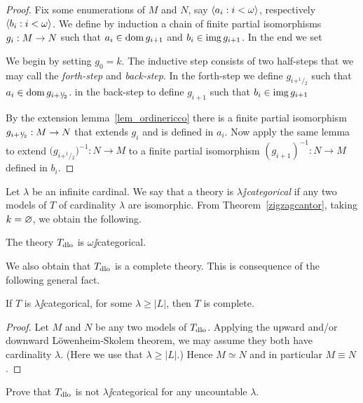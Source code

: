 \documentclass[creche.tex]{subfiles}
\begin{document}
\begin{proof}
Fix some enumerations of $M$ and $N$, say $\langle a_i:i<\omega\rangle$, respectively $\langle b_i:i<\omega\rangle$.  We define by induction a chain of finite partial isomorphisms $g_i:M\rightarrow N$ such that $a_i\in\mathop{\rm dom} g_{i+1}$ and $b_i\in\mathop{\rm img} g_{i+1}$. In the end we set


We begin by setting $g_0=k$. The inductive step consists of two half-steps that we may call the \textit{forth-step} and \textit{back-step}. In the forth-step we define $g_{i+^1\!\!/\!_2}$ such that $a_i\in\mathop{\rm dom} g_{i+^1\!\!/\!_2}$. in the back-step to define $g_{i+1}$ such that $b_i\in\mathop{\rm img} g_{i+1}$

By the extension lemma~\ref{lem_ordinericco} there is a finite partial isomorphism $g_{i+^1\!\!/\!_2}:M\rightarrow N$ that extends $g_i$ and is defined in $a_i$. Now apply the same lemma to extend $\big(g_{i+^1\!\!/\!_2}\big)^{-1}:N\to M$ to a finite partial isomorphism $(g_{i+1})^{-1}:N\to M$ defined in $b_i$.
\end{proof}

Let $\lambda$ be an infinite cardinal. We say that a theory is \emph{$\lambda\jj$categorical\/} if any two models of $T$ of cardinality $\lambda$ are isomorphic. From Theorem~\ref{zigzagcantor}, taking $k=\varnothing$, we obtain the following.

\begin{corollary}
The theory $T_{\rm dlo}$ is $\omega\jj$categorical.\QED
\end{corollary}

We also obtain that $T_{\rm dlo}$ is a complete theory. This is consequence of the following general fact.

\begin{proposition}\label{thm_categorical->complete}
If $T$ is $\lambda\jj$categorical, for some $\lambda\ge|L|$, then $T$ is complete.
\end{proposition}

\begin{proof}
Let $M$ and $N$ be any two models of $T_{\rm dlo}$. Applying the upward and/or downward L\"owenheim-Skolem theorem, we may assume they both have cardinality $\lambda$. (Here we use that $\lambda\ge|L|$.) Hence $M\simeq N$ and in particular $M\equiv N$.
\end{proof}

\begin{exercise}
Prove that $T_{\rm dlo}$ is not $\lambda\jj$categorical for any uncountable $\lambda$.\QED
\end{exercise}
\end{document}
